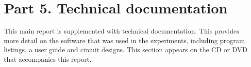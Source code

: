 \documentclass{epr400}
\begin{document}
\maketitlepage
\pagestyle{fancy}
\fancyfoot{}
\renewcommand{\headrulewidth}{0pt}
\rhead{\rightmark}
\fancyfoot[R]{\thepage}
\renewcommand{\sectionmark}[1]{ \markright{#1}{} }
\setcounter{page}{1}

\newpage
{}
\setlength{\cftsubsecnumwidth}{1em}
\setlength{\cftsubsubsecnumwidth}{2em}
\tableofcontents




\newpage
\printbibliography[heading=subbibnumbered]
\section*{Part 5. Technical documentation}

This main report is supplemented with technical documentation. This 
provides  more  detail  on  the  software  that  was  used  in  the  
experiments,  including  program  listings,  a  user  guide  and  circuit  
designs. This section appears on the CD or DVD that accompanies this 
report. 
\end{document}
